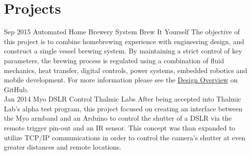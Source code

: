 \documentclass[print]{friggeri-cv} %
\begin{document}
\section{Projects}
\begin{entrylist}

\entry
{Sep 2015}
{}
{Automated Home Brewery System}
{Brew It Yourself}
{The objective of this project is to combine homebrewing experience with engineering design, and construct a single vessel brewing system. By maintaining a strict control of key parameters, the brewing process is regulated using a combination of fluid mechanics, heat transfer, digital controls, power systems, embedded robotics and mobile development.  For more information please see the \href{https://github.com/BrewItYourself/Documentation/blob/master/Final\%20Report/finalreportpdf/final-report.pdf}{Design Overview} on GitHub.}\\

\entry
{Jan 2014}
{}
{Myo DSLR Control}
{Thalmic Labs}
{After being accepted into Thalmic Lab's alpha test program, this project focused on creating an interface between the Myo armband and an Arduino to control the shutter of a DSLR via the remote trigger pin-out and an IR sensor.  This concept was than expanded to utilize TCP/IP communications in order to control the camera's shutter at even greater distances and remote locations.}
\end{entrylist}
%
%
%
\end{document}
